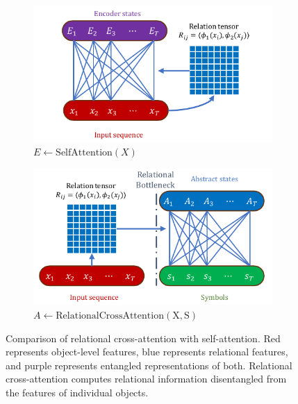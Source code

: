 \begin{figure}
    \begin{subfigure}[b]{0.5\textwidth}
        \centering
        \includegraphics[width=\textwidth]{figures/self_attn_fig.pdf}
        \caption{$E \gets \mathrm{SelfAttention}(X)$}
        \label{fig:self_attention}
    \end{subfigure}
    \hfill
    \begin{subfigure}[b]{0.5\textwidth}
        \centering
        \includegraphics[width=\textwidth]{figures/rel_crossattn_fig.pdf}
        \caption{$A \gets \mathrm{RelationalCrossAttention(X, S)}$}
        \label{fig:relational_cross_attention}
    \end{subfigure}
    \caption{Comparison of relational cross-attention with self-attention. Red represents object-level features, blue represents relational features, and purple represents entangled representations of both. Relational cross-attention computes relational information disentangled from the features of individual objects.}\label{fig:attn_mechanisms}
\end{figure}

